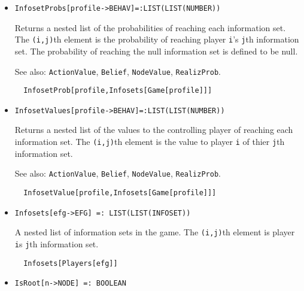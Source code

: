 \begin{itemize}
\item{}
\protect \large \begin{verbatim}
InfosetProbs[profile->BEHAV]=:LIST(LIST(NUMBER))
\end{verbatim}\normalsize

\bd

Returns a nested list of the probabilities of reaching each
information set.  The \verb+(i,j)+th element is the probability of
reaching player \verb+i+'s \verb+j+th information set. The probability
of reaching the null information set is defined to be null.  

\item
[See also:] \verb+ActionValue+, \verb+Belief+, \verb+NodeValue+,
\verb+RealizProb+.

\begin{verbatim}
  InfosetProb[profile,Infosets[Game[profile]]]
\end{verbatim}

\ed

\item{}
\protect \large \begin{verbatim}
InfosetValues[profile->BEHAV]=:LIST(LIST(NUMBER))
\end{verbatim}\normalsize

\bd
Returns a nested list of the values to the controlling player of
reaching each information set.  The \verb+(i,j)+th element is the
value to player \verb+i+ of thier \verb+j+th information set.  
\item
[See also:] \verb+ActionValue+, \verb+Belief+, \verb+NodeValue+,
\verb+RealizProb+.

\begin{verbatim}
  InfosetValue[profile,Infosets[Game[profile]]]
\end{verbatim}
\ed

\item{}
\protect \large \begin{verbatim}
Infosets[efg->EFG] =: LIST(LIST(INFOSET)) 
\end{verbatim}\normalsize

\bd 
A nested list of information sets in the game. The \verb+(i,j)+th
element is player \verb+i+s \verb+j+th information set.  
\begin{verbatim}
  Infosets[Players[efg]]
\end{verbatim} 
\ed

\item{}
\protect \large \begin{verbatim}
IsRoot[n->NODE] =: BOOLEAN 
\end{verbatim}\normalsize


\end{itemize}
